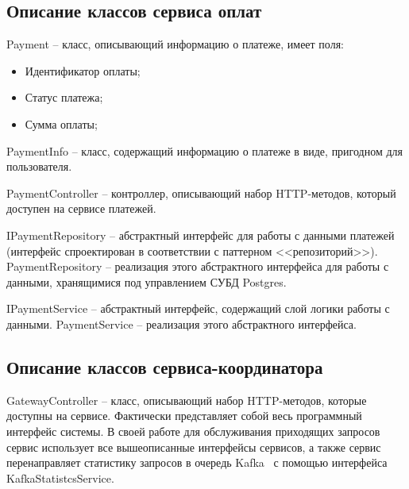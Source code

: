 \subsection*{Описание классов сервиса оплат}

Payment -- класс, описывающий информацию о платеже, имеет поля:

\begin{itemize}
	\item Идентификатор оплаты;
	
	\item Статус платежа;
	
	\item Сумма оплаты;
\end{itemize}

PaymentInfo -- класс, содержащий информацию о платеже в виде, пригодном для пользователя.

PaymentController -- контроллер, описывающий набор HTTP-методов, который доступен на сервисе платежей.

IPaymentRepository -- абстрактный интерфейс для работы с данными платежей (интерфейс спроектирован в соответствии с паттерном <<репозиторий>>). PaymentRepository -- реализация этого абстрактного интерфейса для работы с данными, хранящимися под управлением СУБД Postgres.

IPaymentService -- абстрактный интерфейс, содержащий слой логики работы с данными. PaymentService -- реализация этого абстрактного интерфейса.

\subsection*{Описание классов сервиса-координатора}

GatewayController -- класс, описывающий набор HTTP-методов, которые доступны на сервисе. Фактически представляет собой весь программный интерфейс системы. В своей работе для обслуживания приходящих запросов сервис использует все вышеописанные интерфейсы сервисов, а также сервис перенаправляет статистику запросов в очередь Kafka~\cite{kafka} с помощью интерфейса KafkaStatistcsService.
